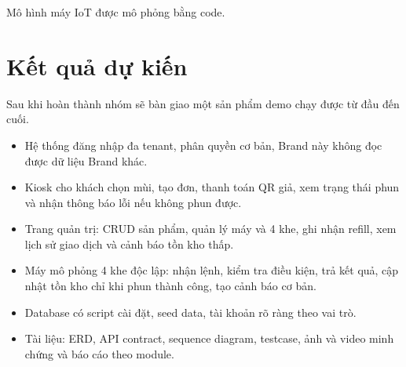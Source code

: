 Mô hình máy IoT được mô phỏng bằng code.

\section{Kết quả dự kiến}

Sau khi hoàn thành nhóm sẽ bàn giao một sản phẩm demo chạy được từ đầu đến cuối.

\begin{itemize}
  \item Hệ thống đăng nhập đa tenant, phân quyền cơ bản, Brand này không đọc được dữ liệu Brand khác.
  \item Kiosk cho khách chọn mùi, tạo đơn, thanh toán QR giả, xem trạng thái phun và nhận thông báo lỗi nếu không phun được.
  \item Trang quản trị: CRUD sản phẩm, quản lý máy và 4 khe, ghi nhận refill, xem lịch sử giao dịch và cảnh báo tồn kho thấp.
  \item Máy mô phỏng 4 khe độc lập: nhận lệnh, kiểm tra điều kiện, trả kết quả, cập nhật tồn kho chỉ khi phun thành công, tạo cảnh báo cơ bản.
  \item Database có script cài đặt, seed data, tài khoản rõ ràng theo vai trò.
  \item Tài liệu: ERD, API contract, sequence diagram, testcase, ảnh và video minh chứng và báo cáo theo module.
\end{itemize}
